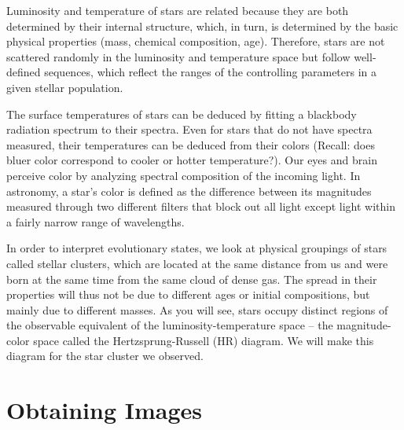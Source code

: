 Luminosity and temperature of stars are related because they are both determined by their internal structure, which, in turn, is determined by the basic physical properties (mass, chemical composition, age). Therefore, stars are not scattered randomly in the luminosity and temperature space but follow well-defined sequences, which reflect the ranges of the controlling parameters in a given stellar population. 

The surface temperatures of stars can be deduced by fitting a blackbody radiation spectrum to their spectra. Even for stars that do not have spectra measured, their temperatures can be deduced from their colors (Recall: does bluer color correspond to cooler or hotter temperature?). Our eyes and brain perceive color by analyzing spectral composition of the incoming light. In astronomy, a star's color is defined as the difference between its magnitudes measured through two different filters that block out all light except light within a fairly narrow range of wavelengths. 

In order to interpret evolutionary states, we look at physical groupings of stars called stellar clusters, which are located at the same distance from us and were born at the same time from the same cloud of dense gas. The spread in their properties will thus not be due to different ages or initial compositions, but mainly due to different masses. As you will see, stars occupy distinct regions of the observable equivalent of the luminosity-temperature space – the magnitude-color space called the Hertzsprung-Russell (HR) diagram. We will make this diagram for the star cluster we observed.

\section{Obtaining Images}

